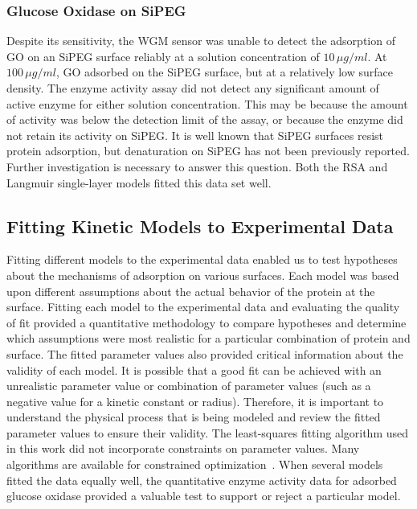 \subsubsection{Glucose Oxidase on SiPEG}

Despite its sensitivity, the WGM sensor was unable to detect the adsorption
of GO on an SiPEG surface reliably at a solution concentration of
$10\,\mu g/ml$. At $100\,\mu g/ml$, GO adsorbed on the SiPEG surface,
but at a relatively low surface density. The enzyme activity assay
did not detect any significant amount of active enzyme for either
solution concentration. This may be because the amount of activity
was below the detection limit of the assay, or because the enzyme
did not retain its activity on SiPEG. It is well known that SiPEG
surfaces resist protein adsorption, but denaturation on SiPEG has
not been previously reported. Further investigation is necessary to
answer this question. Both the RSA and Langmuir single-layer models
fitted this data set well.


\subsection{Fitting Kinetic Models to Experimental Data}

Fitting different models to the experimental data enabled us to test
hypotheses about the mechanisms of adsorption on various surfaces.
Each model was based upon different assumptions about the actual behavior
of the protein at the surface. Fitting each model to the experimental
data and evaluating the quality of fit provided a quantitative methodology
to compare hypotheses and determine which assumptions were most realistic
for a particular combination of protein and surface. The fitted parameter
values also provided critical information about the validity of each
model. It is possible that a good fit can be achieved with an unrealistic
parameter value or combination of parameter values (such as a negative
value for a kinetic constant or radius). Therefore, it is important
to understand the physical process that is being modeled and review
the fitted parameter values to ensure their validity. The least-squares
fitting algorithm used in this work did not incorporate constraints
on parameter values. Many algorithms are available for constrained
optimization~\cite{Gill1981,Jones2001-}. When several models fitted
the data equally well, the quantitative enzyme activity data for adsorbed
glucose oxidase provided a valuable test to support or reject a particular
model. 


